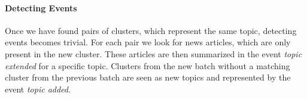 \paragraph{Detecting Events} Once we have found pairs of clusters, which represent the same topic, detecting events becomes trivial. For each pair we look for news articles, which are only present in the new cluster. These articles are then summarized in the event \textit{topic extended} for a specific topic. Clusters from the new batch without a matching cluster from the previous batch are seen as new topics and represented by the event \textit{topic added}.